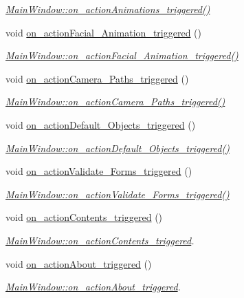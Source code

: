 \begin{DoxyCompactItemize}
\begin{DoxyCompactList}\small\item\em \hyperlink{class_main_window_aab19d695ce2f45f385dae020164106de}{Main\+Window\+::on\+\_\+action\+Animations\+\_\+triggered()} \end{DoxyCompactList}\item 
void \hyperlink{class_main_window_a3680a8291f643a15e4373b92556c031f}{on\+\_\+action\+Facial\+\_\+\+Animation\+\_\+triggered} ()
\begin{DoxyCompactList}\small\item\em \hyperlink{class_main_window_a3680a8291f643a15e4373b92556c031f}{Main\+Window\+::on\+\_\+action\+Facial\+\_\+\+Animation\+\_\+triggered()} \end{DoxyCompactList}\item 
void \hyperlink{class_main_window_a11bc264b622ed0f4e4edc3ec2924b799}{on\+\_\+action\+Camera\+\_\+\+Paths\+\_\+triggered} ()
\begin{DoxyCompactList}\small\item\em \hyperlink{class_main_window_a11bc264b622ed0f4e4edc3ec2924b799}{Main\+Window\+::on\+\_\+action\+Camera\+\_\+\+Paths\+\_\+triggered()} \end{DoxyCompactList}\item 
void \hyperlink{class_main_window_a702f0e3265e104d9a37c6bd5e0df29fb}{on\+\_\+action\+Default\+\_\+\+Objects\+\_\+triggered} ()
\begin{DoxyCompactList}\small\item\em \hyperlink{class_main_window_a702f0e3265e104d9a37c6bd5e0df29fb}{Main\+Window\+::on\+\_\+action\+Default\+\_\+\+Objects\+\_\+triggered()} \end{DoxyCompactList}\item 
void \hyperlink{class_main_window_a02d0301ee80141c512d471c3af894f0d}{on\+\_\+action\+Validate\+\_\+\+Forms\+\_\+triggered} ()
\begin{DoxyCompactList}\small\item\em \hyperlink{class_main_window_a02d0301ee80141c512d471c3af894f0d}{Main\+Window\+::on\+\_\+action\+Validate\+\_\+\+Forms\+\_\+triggered()} \end{DoxyCompactList}\item 
void \hyperlink{class_main_window_a81fc0d75b7181abbd814b907fa3ba7a4}{on\+\_\+action\+Contents\+\_\+triggered} ()
\begin{DoxyCompactList}\small\item\em \hyperlink{class_main_window_a81fc0d75b7181abbd814b907fa3ba7a4}{Main\+Window\+::on\+\_\+action\+Contents\+\_\+triggered}. \end{DoxyCompactList}\item 
void \hyperlink{class_main_window_a4f3ebda1ba39e0ef4d678b44893c9c7f}{on\+\_\+action\+About\+\_\+triggered} ()
\begin{DoxyCompactList}\small\item\em \hyperlink{class_main_window_a4f3ebda1ba39e0ef4d678b44893c9c7f}{Main\+Window\+::on\+\_\+action\+About\+\_\+triggered}. \end{DoxyCompactList}\end{DoxyCompactItemize}
